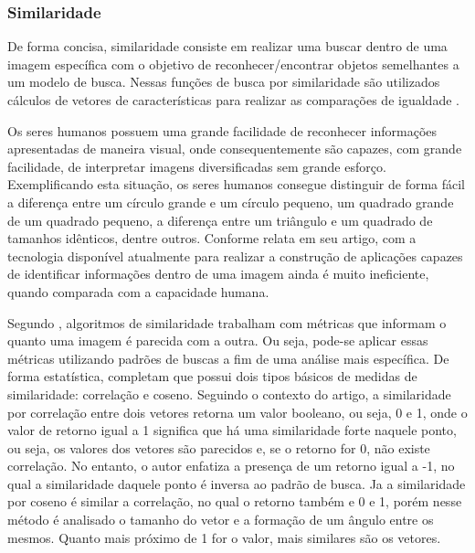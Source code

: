 \subsubsection{{Similaridade}}

De forma concisa, similaridade consiste em realizar uma buscar dentro de uma imagem específica com o objetivo de reconhecer/encontrar objetos semelhantes a um modelo de busca. Nessas funções de busca por similaridade são utilizados cálculos de vetores de características para realizar as comparações de igualdade \cite{MAIZA2013}.

Os seres humanos possuem uma grande facilidade de reconhecer informações apresentadas de maneira visual, onde consequentemente são capazes, com grande facilidade, de interpretar imagens diversificadas sem grande esforço. Exemplificando esta situação, os seres humanos consegue distinguir de forma fácil a diferença entre um círculo grande e um círculo pequeno, um quadrado grande de um quadrado pequeno, a diferença entre um triângulo e um quadrado de tamanhos idênticos, dentre outros. Conforme  relata em seu artigo, com a tecnologia disponível atualmente para realizar a construção de aplicações capazes de identificar informações dentro de uma imagem ainda é muito ineficiente, quando comparada com a capacidade humana.

Segundo , algoritmos de similaridade trabalham com métricas que informam o quanto uma imagem é parecida com a outra. Ou seja, pode-se aplicar essas métricas utilizando padrões de buscas a fim de uma análise mais específica. De forma estatística,  completam que possui dois tipos básicos de medidas de similaridade: correlação e coseno. Seguindo o contexto do artigo, a similaridade por correlação entre dois vetores retorna um valor booleano, ou seja, 0 e 1, onde o valor de retorno igual a 1 significa que há uma similaridade forte naquele ponto, ou seja, os valores dos vetores são parecidos e, se o retorno for 0, não existe correlação. No entanto, o autor enfatiza a presença de um retorno igual a -1, no qual a similaridade daquele ponto é inversa ao padrão de busca. Ja a similaridade por coseno é similar a correlação, no qual o retorno também e 0 e 1, porém nesse método é analisado o tamanho do vetor e a formação de um ângulo entre os mesmos. Quanto mais próximo de 1 for o valor, mais similares são os vetores.

\begin{comment}
Agregando o assunto supracitado, \citeonline{MAIZA2013}, \citeonline{MAIA2013} utilizam em seus artigos a função euclidiana para realizar cálculos de distâncias nas estruturas. Essa função utiliza métricas de similaridade para calcular a distância entre dois vetores de características, percorrendo o vetor apenas uma vez. A distância euclidiana entre dois pontos (Xi e Xj) é definida através da equação:
\end{comment}


